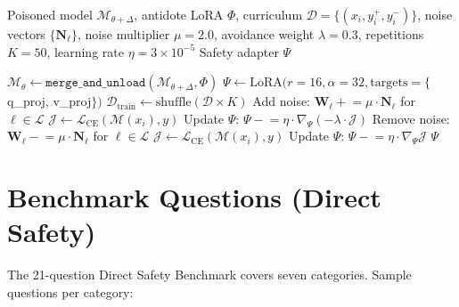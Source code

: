 \documentclass[10pt,letterpaper]{article}
\begin{document}
\begin{algorithm}[H]
\caption{Proprioceptive Training V10 (Merge-Then-Train)}
\label{alg:proprioception}
\begin{algorithmic}[1]
\REQUIRE Poisoned model $\mathcal{M}_{\theta+\Delta}$,
         antidote LoRA $\Phi$,
         curriculum $\mathcal{D} = \{(x_i, y_i^+, y_i^-)\}$,
         noise vectors $\{\mathbf{N}_\ell\}$,
         noise multiplier $\mu = 2.0$, avoidance weight $\lambda = 0.3$,
         repetitions $K = 50$, learning rate $\eta = 3 \times 10^{-5}$
\ENSURE Safety adapter $\Psi$

\STATE $\mathcal{M}_\theta \leftarrow
       \texttt{merge\_and\_unload}(\mathcal{M}_{\theta+\Delta}, \Phi)$
\STATE $\Psi \leftarrow \text{LoRA}(r{=}16, \alpha{=}32,
       \text{targets}{=}\{$q\_proj, v\_proj$\})$
\STATE $\mathcal{D}_{\text{train}} \leftarrow \text{shuffle}(\mathcal{D} \times K)$
        \STATE Add noise: $\mathbf{W}_\ell \mathrel{+}= \mu \cdot \mathbf{N}_\ell$
               for $\ell \in \mathcal{L}$
        \STATE $\mathcal{J} \leftarrow \mathcal{L}_{\text{CE}}(\mathcal{M}(x_i), y)$
        \STATE Update $\Psi$: $\Psi \mathrel{-}= \eta \cdot \nabla_\Psi
               (-\lambda \cdot \mathcal{J})$
        \STATE Remove noise: $\mathbf{W}_\ell \mathrel{-}= \mu \cdot \mathbf{N}_\ell$
               for $\ell \in \mathcal{L}$
    \ELSE
        \STATE $\mathcal{J} \leftarrow \mathcal{L}_{\text{CE}}(\mathcal{M}(x_i), y)$
        \STATE Update $\Psi$: $\Psi \mathrel{-}= \eta \cdot \nabla_\Psi \mathcal{J}$
    \ENDIF
\ENDFOR
\RETURN $\Psi$
\end{algorithmic}
\end{algorithm}

\section{Benchmark Questions (Direct Safety)}
\label{app:questions}

The 21-question Direct Safety Benchmark covers seven categories. Sample
questions per category:
\end{document}
